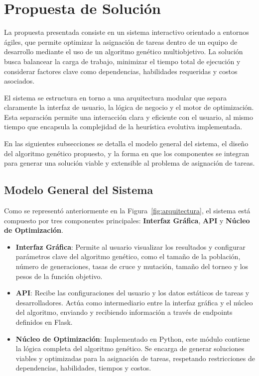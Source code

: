 \section{Propuesta de Solución}

La propuesta presentada consiste en un sistema interactivo orientado a entornos ágiles, que permite optimizar la asignación de tareas dentro de un equipo de desarrollo mediante el uso de un algoritmo genético multiobjetivo. La solución busca balancear la carga de trabajo, minimizar el tiempo total de ejecución y considerar factores clave como dependencias, habilidades requeridas y costos asociados.

El sistema se estructura en torno a una arquitectura modular que separa claramente la interfaz de usuario, la lógica de negocio y el motor de optimización. Esta separación permite una interacción clara y eficiente con el usuario, al mismo tiempo que encapsula la complejidad de la heurística evolutiva implementada.

En las siguientes subsecciones se detalla el modelo general del sistema, el diseño del algoritmo genético propuesto, y la forma en que los componentes se integran para generar una solución viable y extensible al problema de asignación de tareas.

\subsection{Modelo General del Sistema}

Como se representó anteriormente en la Figura~\ref{fig:arquitectura}, el sistema está compuesto por tres componentes principales: \textbf{Interfaz Gráfica}, \textbf{API} y \textbf{Núcleo de Optimización}.

\begin{itemize}
    \item \textbf{Interfaz Gráfica}: Permite al usuario visualizar los resultados y configurar parámetros clave del algoritmo genético, como el tamaño de la población, número de generaciones, tasas de cruce y mutación, tamaño del torneo y los pesos de la función objetivo.

    \item \textbf{API}: Recibe las configuraciones del usuario y los datos estáticos de tareas y desarrolladores. Actúa como intermediario entre la interfaz gráfica y el núcleo del algoritmo, enviando y recibiendo información a través de endpoints definidos en Flask.

    \item \textbf{Núcleo de Optimización}: Implementado en Python, este módulo contiene la lógica completa del algoritmo genético. Se encarga de generar soluciones viables y optimizadas para la asignación de tareas, respetando restricciones de dependencias, habilidades, tiempos y costos.
\end{itemize}

